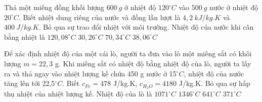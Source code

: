 \begin{vidu} 
	Thả một miếng đồng khối lượng $600\ g$ ở nhiệt độ $120^\circ C$ vào $500\ g$ nước ở nhiệt độ $20^\circ C$. Biết nhiệt dung riêng của nước và đồng lần lượt là $4,2\ kJ/kg . K$ và $400\ J/kg . K$. Bỏ qua sự trao đổi nhiệt với môi trường. Nhiệt độ của nước khi cân bằng nhiệt là
	\choice
	{$120,08^\circ C$}
	{\True $30,26^\circ C$}
	{$70,34^\circ C$}
	{$38,06^\circ C$}
\end{vidu}
\begin{vidu}%
	Để xác định nhiệt độ của một cái lò, người ta đưa vào lò một miếng sắt có khối lượng $m=22,3$ g. Khi miếng sắt có nhiệt độ bằng nhiệt độ của lò, người ta lấy ra và thả ngay vào nhiệt lượng kế chứa 450 g nước ở 15$^{\circ}C$, nhiệt độ của nước tăng lên tới 22,5$^{\circ}C$. Biết $c_{Fe}=478$ J/kg.K, $c_{H_2O}=4180$ J/kg.K. Bỏ qua sự hấp thụ nhiệt của nhiệt lượng kế. Nhiệt độ của lò là
	\choice
	{$1071^{\circ}C$}
	{\True $1346^{\circ}C$}
	{$641^{\circ}C$}
	{$371^{\circ}C$}
	\end{vidu}
